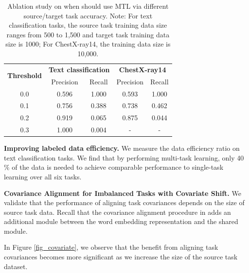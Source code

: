 \begin{table}
\begin{center}
  \begin{tabular}{c c c c c}
  \toprule
    \multirow{2}{*}{{\bf Threshold}}  & \multicolumn{2}{c}{{\bf Text classification}} & \multicolumn{2}{c}{{\bf ChestX-ray14}} \\
    & Precision &  Recall & Precision &  Recall \\
    \cmidrule(lr){1-1} \cmidrule(lr){2-3} \cmidrule(lr){4-5}
    0.0 & 0.596 & 1.000 & 0.593 & 1.000 \\
    0.1 & 0.756 & 0.388 & 0.738 & 0.462 \\
    0.2 & 0.919 & 0.065 & 0.875 & 0.044 \\	
    0.3 & 1.000 & 0.004 &     - &     - \\
  \bottomrule
  \end{tabular}
\end{center}
\caption{Ablation study on when should use MTL via different source/target task accuracy. Note: For text classification tasks, the source task training data size ranges from 500 to 1,500 and target task training data size is 1000; For ChestX-ray14, the training data size is 10,000.}
\label{tab:mtl_better_than_stl}
\end{table}

\textbf{Improving labeled data efficiency.}
We measure the data efficiency ratio on text classification tasks.
We find that by performing multi-task learning, only 40$\%$ of the data is needed to achieve comparable performance to single-task learning over all six tasks.


\textbf{Covariance Alignment for Imbalanced Tasks with Covariate Shift.}
We validate that the performance of aligning task covariances depends on the size of source task data.
Recall that the covariance alignment procedure in \cite{WZR20} adds an additional module between the word embedding representation and the shared module.

In Figure \ref{fig_covariate}, we observe that the benefit from aligning task covariances becomes more significant as we increase the size of the source task dataset.

